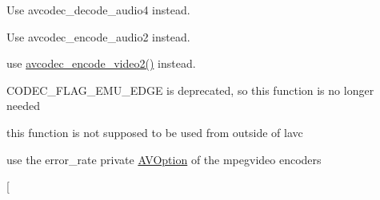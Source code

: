 \begin{DoxyRefList}
\item[\label{deprecated__deprecated000006}%
\hypertarget{deprecated__deprecated000006}{}%
Member \hyperlink{group__lavc__decoding_gac552241713bbc0eae2206a75d211daf4}{avcodec\+\_\+decode\+\_\+audio3} (\hyperlink{struct_a_v_codec_context}{A\+V\+Codec\+Context} $\ast$avctx, int16\+\_\+t $\ast$samples, int $\ast$frame\+\_\+size\+\_\+ptr, \hyperlink{struct_a_v_packet}{A\+V\+Packet} $\ast$avpkt)]Use avcodec\+\_\+decode\+\_\+audio4 instead. 
\item[\label{deprecated__deprecated000008}%
\hypertarget{deprecated__deprecated000008}{}%
Member \hyperlink{group__lavc__encoding_gaf12a9da0d33f50ff406e03572fab4763}{avcodec\+\_\+encode\+\_\+audio} (\hyperlink{struct_a_v_codec_context}{A\+V\+Codec\+Context} $\ast$avctx, uint8\+\_\+t $\ast$buf, int buf\+\_\+size, const short $\ast$samples)]Use avcodec\+\_\+encode\+\_\+audio2 instead. 
\item[\label{deprecated__deprecated000009}%
\hypertarget{deprecated__deprecated000009}{}%
Member \hyperlink{group__lavc__encoding_ga22847c21918ee93a4d05f7ffb419f9a9}{avcodec\+\_\+encode\+\_\+video} (\hyperlink{struct_a_v_codec_context}{A\+V\+Codec\+Context} $\ast$avctx, uint8\+\_\+t $\ast$buf, int buf\+\_\+size, const \hyperlink{struct_a_v_frame}{A\+V\+Frame} $\ast$pict)]use \hyperlink{group__lavc__encoding_gaa2dc9e9ea2567ebb2801a08153c7306b}{avcodec\+\_\+encode\+\_\+video2()} instead. 
\item[\label{deprecated__deprecated000005}%
\hypertarget{deprecated__deprecated000005}{}%
Member \hyperlink{group__lavc__decoding_gaad92aaeee369795273fc6cfc6ef3b189}{avcodec\+\_\+get\+\_\+edge\+\_\+width} (void)]C\+O\+D\+E\+C\+\_\+\+F\+L\+A\+G\+\_\+\+E\+M\+U\+\_\+\+E\+D\+GE is deprecated, so this function is no longer needed  
\item[\label{deprecated__deprecated000012}%
\hypertarget{deprecated__deprecated000012}{}%
Member \hyperlink{group__lavc__misc_ga4e17541c4f237465b50668d279192da8}{avcodec\+\_\+set\+\_\+dimensions} (\hyperlink{struct_a_v_codec_context}{A\+V\+Codec\+Context} $\ast$s, int width, int height)]this function is not supposed to be used from outside of lavc  
\item[\label{deprecated__deprecated000022}%
\hypertarget{deprecated__deprecated000022}{}%
Member \hyperlink{struct_a_v_codec_context_ae6c5c21d82ecb2dc36a9180979c81227}{A\+V\+Codec\+Context\+:\+:error\+\_\+rate} ]use the \textquotesingle{}error\+\_\+rate\textquotesingle{} private \hyperlink{struct_a_v_option}{A\+V\+Option} of the mpegvideo encoders  
\item[\label{deprecated__deprecated000017}%

\end{DoxyRefList}
